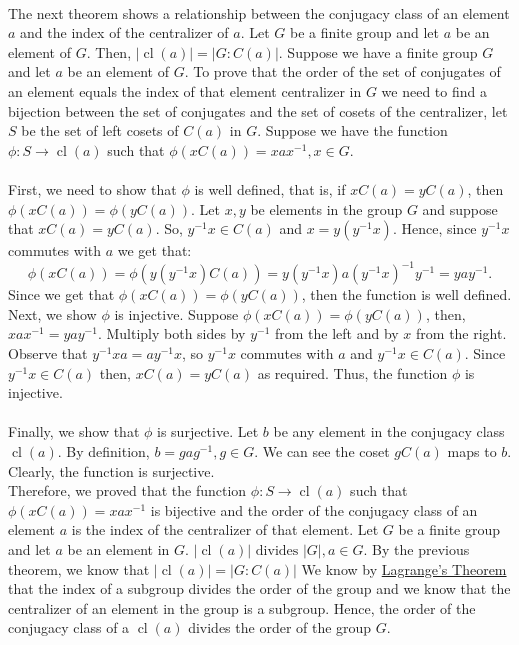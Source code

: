 \documentclass[a4paper,12pt]{article}
\begin{document}
\mbox{ } \\
The next theorem shows a relationship between the conjugacy class of an element $a$ and the index of the centralizer of $a.$
{
    Let $G$ be a finite group and let $a$ be an element of $G.$ Then, $|\operatorname{cl}(a)|=|G:C(a)|.$
}
{
    Suppose we have a finite group $G$ and let $a$ be an element of $G$. To prove that the order of the set of conjugates of an element equals the index of that element centralizer in $G$ we need to find a bijection between the set of conjugates and the set of cosets of the centralizer, let $S$ be the set of left cosets of $C(a)$ in $G$.
    Suppose we have the function $\phi: S\to \operatorname{cl}(a)$ such that $\phi(xC(a))=xax^{-1}, x \in G.$ \\ \\
    First, we need to show that $\phi$ is well defined, that is, if $xC(a)=yC(a)$, then $\phi(xC(a))=\phi(yC(a)).$
    Let $x,y$ be elements in the group $G$ and suppose that $xC(a)=yC(a).$ So, $y^{-1}x\in C(a)$ and $x=y(y^{-1}x).$ Hence, since $y^{-1}x$ commutes with $a$ we get that: $$\phi(xC(a))=\phi(y(y^{-1}x)C(a))=y(y^{-1}x)a(y^{-1}x)^{-1}y^{-1}=yay^{-1}.$$
    Since we get that $\phi(xC(a))=\phi(yC(a))$, then the function is well defined.\\
    Next, we show $\phi$ is injective. Suppose $\phi(xC(a))=\phi(yC(a))$, then, $xax^{-1}=yay^{-1}.$ Multiply both sides by $y^{-1}$ from the left and by $x$ from the right. Observe that $y^{-1}xa=ay^{-1}x$, so $y^{-1}x$ commutes with $a$ and $y^{-1}x \in C(a).$ Since $y^{-1}x \in C(a)$ then, $xC(a)=yC(a)$ as required. Thus, the function $\phi$ is injective.
    \\ \\
    Finally, we show that $\phi$ is surjective. Let $b$ be any element in the conjugacy class $\operatorname{cl}(a).$ By definition, $b=gag^{-1}, g \in G.$ We can see the coset $gC(a)$ maps to $b$. Clearly, the function is surjective.
    \\ Therefore, we proved that the function $\phi: S \to \operatorname{cl}(a)$ such that $\phi(xC(a))=xax^{-1}$ is bijective and the order of the conjugacy class of an element $a$ is the index of the centralizer of that element.
}
\corp{}{}
{
    Let $G$ be a finite group and let $a$ be an element in $G$. $|\operatorname{cl}(a)| \text{ divides } |G|, a\in G.$ }
{
    By the previous theorem, we know that $|\operatorname{cl}(a)|=|G:C(a)|$ We know by \hyperref[thm:Lagrange]{Lagrange's Theorem} that the index of a subgroup divides the order of the group and we know that the centralizer of an element in the group is a subgroup. Hence, the order of the conjugacy class of a $\operatorname{cl}(a)$ divides the order of the group $G.$
}
\end{document}
